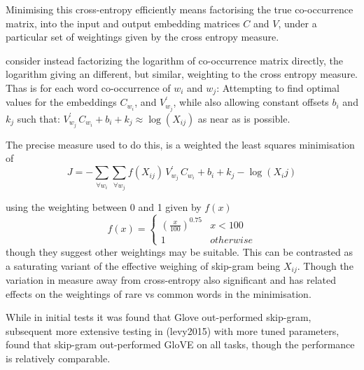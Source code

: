 \documentclass[parskip]{komatufte}
\begin{document}
Minimising this cross-entropy efficiently means factorising the true co-occurrence matrix,
into the input and output embedding matrices $C$ and $V$, under a particular set of weightings given by the cross entropy measure.

 consider instead factorizing the logarithm of co-occurrence matrix directly,
the logarithm giving an different, but similar, weighting to the cross entropy measure.
Thas is for each word co-occurrence of $w_i$ and $w_j$: Attempting to find optimal values for 
the embeddings $C_{w_{i}}$, and $V_{w_j}^\prime$, while also allowing constant offsets $b_i$ and $k_j$
such that:
$V_{w_j}^\prime\,C_{w_{i}} + b_i + k_j \approx \log(X_{ij})$
as near as is possible.


The precise measure used to do this, is a weighted the least squares minimisation of 
\begin{equation}
J = - \sum_{\forall w_i}  \sum_{\forall w_j} f(X_{ij})\,V_{w_j}^\prime\,C_{w_{i}}+b_i+k_j-\log (X_ij)
\end{equation}


using the weighting between 0 and 1 given by $f(x)$
\begin{equation}
f(x)=\begin{cases}
\left(\frac{x}{100}\right)^{0.75} & x<100\\
1 & otherwise
\end{cases}
\end{equation}
though they suggest other weightings may be suitable.
This can be contrasted as a saturating variant of the effective weighing of skip-gram being $X_{ij}$.
Though the variation in measure away from cross-entropy also significant and has related effects on the weightings of rare vs common words in the minimisation.

While in initial tests it was found that Glove out-performed  skip-gram,
subsequent more extensive testing in \tcite(levy2015) with more tuned parameters,
found that skip-gram out-performed GloVE on all tasks, though the performance is relatively comparable.
\end{document}
